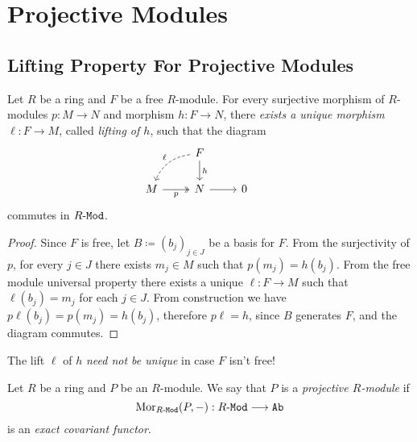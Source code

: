 \section{Projective Modules}

\subsection{Lifting Property For Projective Modules}

\begin{theorem}
\label{thm:free-modules-are-projective}
Let \(R\) be a ring and \(F\) be a free \(R\)-module. For every surjective
morphism of \(R\)-modules \(p: M \to N\) and morphism \(h: F \to N\), there
\emph{exists a unique morphism} \(\ell: F \to M\), called \emph{lifting of
  \(h\)}, such that the diagram
\[
\begin{tikzcd}
&F \ar[d, "h"] \ar[dl, bend right, dashed, "\ell"'] & & \\
M \ar[r, two heads, "p"'] &N \ar[r] &0
\end{tikzcd}
\]
commutes in \({R\text{-}\texttt{Mod}}\).
\end{theorem}

\begin{proof}
Since \(F\) is free, let \(B \coloneq (b_j)_{j \in J}\) be a basis for
\(F\). From the surjectivity of \(p\), for every \(j \in J\) there exists
\(m_j \in M\) such that \(p(m_j) = h(b_j)\). From the free module universal
property there exists a unique \(\ell: F \to M\) such that \(\ell(b_j) = m_j\)
for each \(j \in J\). From construction we have
\(p \ell(b_j) = p(m_j) = h(b_j)\), therefore \(p \ell = h\), since \(B\)
generates \(F\), and the diagram commutes.
\end{proof}

\begin{remark}
\label{rem:uniqueness-of-lifting}
The lift \(\ell\) of \(h\) \emph{need not be unique} in case \(F\) isn't free!
\end{remark}

\begin{definition}
\label{def:projective-module}
Let \(R\) be a ring and \(P\) be an \(R\)-module. We say that \(P\) is a
\emph{projective \(R\)-module} if
\[
\operatorname{Mor}_{{R\text{-}\texttt{Mod}}}(P, -): {R\text{-}\texttt{Mod}} \longrightarrow {\texttt{Ab}}
\]
is an \emph{exact covariant functor}.
\end{definition}


